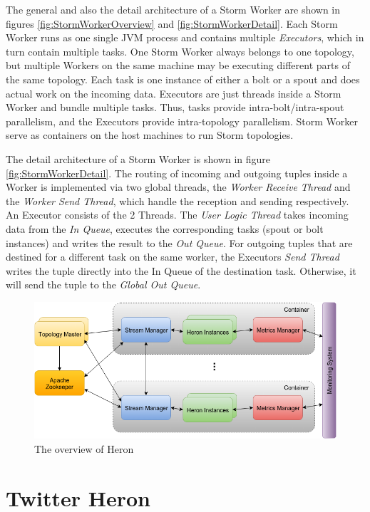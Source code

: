 \documentclass[conference]{IEEEtran}
\begin{document}
The general and also the detail architecture of a Storm Worker are shown in figures \ref{fig:StormWorkerOverview} and \ref{fig:StormWorkerDetail}.
Each Storm Worker runs as one single JVM process and contains multiple \emph{Executors}, which in turn contain multiple tasks.
One Storm Worker always belongs to one topology, but multiple Workers on the same machine may be executing different parts of the same topology.
Each task is one instance of either a bolt or a spout and does actual work on the incoming data.
Executors are just threads inside a Storm Worker and bundle multiple tasks.
Thus, tasks provide intra-bolt/intra-spout parallelism, and the Executors provide intra-topology parallelism.
Storm Worker serve as containers on the host machines to run Storm topologies.

The detail architecture of a Storm Worker is shown in figure \ref{fig:StormWorkerDetail}.
The routing of incoming and outgoing tuples inside a Worker is implemented via two global threads, the \emph{Worker Receive Thread} and the \emph{Worker Send Thread}, which handle the reception and sending respectively.
An Executor consists of the 2 Threads.
The \emph{User Logic Thread} takes incoming data from the \emph{In Queue}, executes the corresponding tasks (spout or bolt instances) and writes the result to the \emph{Out Queue}.
For outgoing tuples that are destined for a different task on the same worker, the Executors \emph{Send Thread} writes the tuple directly into the In Queue of the destination task.
Otherwise, it will send the tuple to the \emph{Global Out Queue}.

\begin{figure}
	\centering
    \includegraphics[scale=0.35]{figures/HeronOverview}
    \caption{The overview of Heron}
    \label{fig:HeronOverview}
\end{figure}

\section{Twitter Heron}
\label{sec:TwitterHeron}
\end{document}
